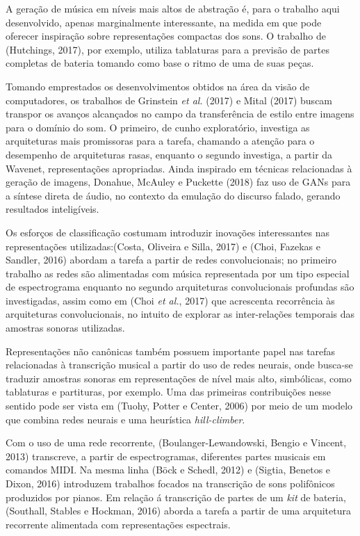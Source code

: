 \documentclass[]{article}
\begin{document}
A geração de música em níveis mais altos de abstração é, para o trabalho
aqui desenvolvido, apenas marginalmente interessante, na medida em que
pode oferecer inspiração sobre representações compactas dos sons. O
trabalho de (Hutchings, 2017), por exemplo, utiliza tablaturas para a
previsão de partes completas de bateria tomando como base o ritmo de uma
de suas peças.

Tomando emprestados os desenvolvimentos obtidos na área da visão de
computadores, os trabalhos de Grinstein \emph{et al.} (2017) e Mital
(2017) buscam transpor os avanços alcançados no campo da transferência
de estilo entre imagens para o domínio do som. O primeiro, de cunho
exploratório, investiga as arquiteturas mais promissoras para a tarefa,
chamando a atenção para o desempenho de arquiteturas rasas, enquanto o
segundo investiga, a partir da Wavenet, representações apropriadas.
Ainda inspirado em técnicas relacionadas à geração de imagens, Donahue,
McAuley e Puckette (2018) faz uso de GANs para a síntese direta de
áudio, no contexto da emulação do discurso falado, gerando resultados
inteligíveis.

Os esforços de classificação costumam introduzir inovações interessantes
nas representações utilizadas:(Costa, Oliveira e Silla, 2017) e (Choi,
Fazekas e Sandler, 2016) abordam a tarefa a partir de redes
convolucionais; no primeiro trabalho as redes são alimentadas com música
representada por um tipo especial de espectrograma enquanto no segundo
arquiteturas convolucionais profundas são investigadas, assim como em
(Choi \emph{et al.}, 2017) que acrescenta recorrência às arquiteturas
convolucionais, no intuito de explorar as inter-relações temporais das
amostras sonoras utilizadas.

Representações não canônicas também possuem importante papel nas tarefas
relacionadas à transcrição musical a partir do uso de redes neurais,
onde busca-se traduzir amostras sonoras em representações de nível mais
alto, simbólicas, como tablaturas e partituras, por exemplo. Uma das
primeiras contribuições nesse sentido pode ser vista em (Tuohy, Potter e
Center, 2006) por meio de um modelo que combina redes neurais e uma
heurística \emph{hill-climber}.

Com o uso de uma rede recorrente, (Boulanger-Lewandowski, Bengio e
Vincent, 2013) transcreve, a partir de espectrogramas, diferentes partes
musicais em comandos MIDI. Na mesma linha (Böck e Schedl, 2012) e
(Sigtia, Benetos e Dixon, 2016) introduzem trabalhos focados na
transcrição de sons polifônicos produzidos por pianos. Em relação á
transcrição de partes de um \emph{kit} de bateria, (Southall, Stables e
Hockman, 2016) aborda a tarefa a partir de uma arquitetura recorrente
alimentada com representações espectrais.
\end{document}
